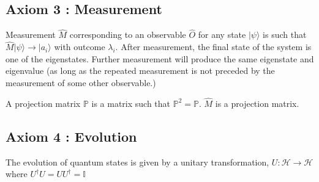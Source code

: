 \documentclass{article}
\begin{document}
        
        \subsection{Axiom 3 : Measurement}
        Measurement $\hat{M}$ corresponding to an observable $\hat{O}$ for any state $| \psi \rangle$ is such that $\hat{M} | \psi \rangle \rightarrow |a_i \rangle$ with outcome $\lambda_i$. After measurement, the final state of the system is one of the eigenstates. Further measurement will produce the same eigenstate and eigenvalue (as long as the repeated measurement is not preceded by the measurement of some other observable.)


        A projection matrix $\mathbb{P}$ is a matrix such that $\mathbb{P}^2 = \mathbb{P}$.  
        $\hat{M}$ is a projection matrix.


        \subsection{Axiom 4 : Evolution}
            The evolution of quantum states is given by a unitary transformation, ${U : \mathcal{H} \rightarrow \mathcal{H}}$ where $U^{\dagger}U = UU^{\dagger} = \mathbb{I}$ 
\end{document}
